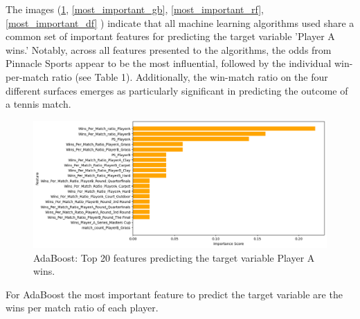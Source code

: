 The images (\ref{most_important_ada}, \ref{most_important_gb}, \ref{most_important_rf}, \ref{most_important_df} )
 indicate that all machine learning algorithms used share a common set of important features for predicting the target variable 'Player A wins.' Notably, across all features presented to the algorithms, the odds from Pinnacle Sports appear to be the most influential, followed by the individual win-per-match ratio (see Table 1). Additionally, the win-match ratio on the four different surfaces emerges as particularly significant in predicting the outcome of a tennis match.

%
\begin{figure}[h]
\includegraphics[width=\textwidth]{pictures/most_important_ada.png}
\caption{AdaBoost: Top 20 features predicting the target variable Player A wins.}
\label{most_important_ada}
\end{figure}
%
For AdaBoost the most important feature to predict the target variable are the wins per match ratio of each player.


